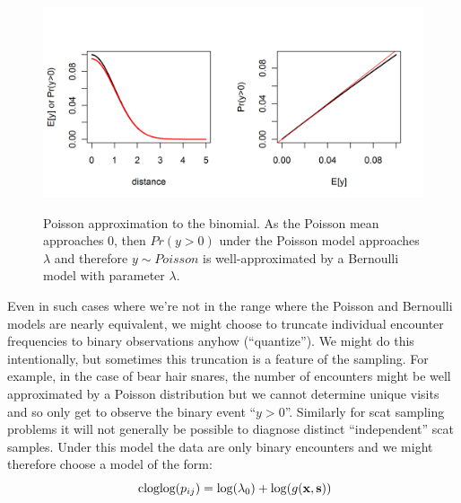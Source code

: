\begin{figure}
\centering
\includegraphics[width=5in,height=2.5in]{Ch5-PoisMn/figs/Poisson-Bern.png}
\caption{Poisson approximation to the binomial. As the Poisson mean
  approaches 0, then $Pr(y>0)$ under the Poisson model approaches
  $\lambda$ and therefore $y \sim Poisson$ is well-approximated by a
  Bernoulli model with parameter $\lambda$.
}
\label{poisson-mn.fig.poissonbern}
\end{figure}

Even in such cases where we're not in the range where the Poisson and
Bernoulli models are nearly equivalent, we might choose to truncate
individual encounter frequencies to binary observations anyhow
(``quantize'').  We might do this intentionally, but sometimes this
truncation is a feature of the sampling. For example, in the case of
bear hair snares, the number of encounters might be well approximated
by a Poisson distribution but we cannot determine unique visits and so
only get to observe the binary event ``$y>0$''. Similarly for scat
sampling problems it will not generally be possible to diagnose
distinct ``independent'' scat samples. Under this model the data are
only binary encounters and we might therefore choose a model of the
form:
\[
\mbox{ cloglog}(p_{ij}) = \log(\lambda_{0})  + \log(g({\bf x},{\bf s}))
\]

